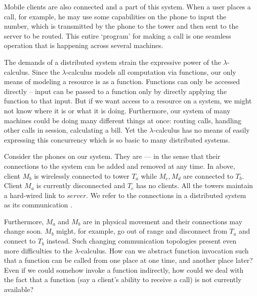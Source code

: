 Mobile clients are also connected and a part of this system.  
When a user places a call, for example, he may use some capabilities on the phone to input the number, which is transmitted by the phone to the tower and then sent to the server to be routed.  
This entire `program' for making a call is one seamless operation that is happening across several machines.  

The demands of a distributed system strain the expressive power of the $\lambda$-calculus.  
Since the $\lambda$-calculus models all computation via functions, our only means of modeling a resource is as a function.  
Functions can only be accessed directly -- input can be passed to a function only by directly applying the function to that input.  
But if we want access to a resource on a system, we might not know where it is or what it is doing.  
Furthermore, our system of many machines could be doing many different things at once: routing calls, handling other calls in session, calculating a bill.  
Yet the $\lambda$-calculus has no means of easily expressing this concurrency which is so basic to many distributed systems.

Consider the phones on our system.  
They are ---  in the sense that their connections to the system can be added and removed at any time.  
In  above, client $M_b$ is wirelessly connected to tower $T_a$ while $M_c,M_d$ are connected to $T_b$.  
Client $M_a$ is currently disconnected and $T_c$ has no clients.  
All the towers maintain a hard-wired link to $server$.  
We refer to the connections in a distributed system as its communication .

Furthermore, $M_a$ and $M_b$ are in physical movement and their connections may change soon.  
$M_b$ might, for example, go out of range and disconnect from $T_a$ and connect to $T_b$ instead.  
Such changing communication topologies present even more difficulties to the $\lambda$-calculus.  
How can we abstract function invocation such that a function can be called from one place at one time, and another place later?  Even if we could somehow invoke a function indirectly, how could we deal with the fact that a function (say a client's ability to receive a call) is not currently available?

